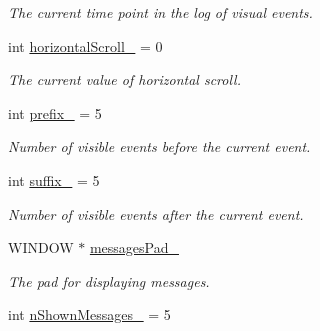 \begin{DoxyCompactItemize}
\begin{DoxyCompactList}\small\item\em The current time point in the log of visual events. \end{DoxyCompactList}\item 
int \hyperlink{structLogWindow_a8f55a1cb912c65f4c0cc5eba7d11cf3c}{horizontal\+Scroll\+\_\+} = 0\hypertarget{structLogWindow_a8f55a1cb912c65f4c0cc5eba7d11cf3c}{}\label{structLogWindow_a8f55a1cb912c65f4c0cc5eba7d11cf3c}

\begin{DoxyCompactList}\small\item\em The current value of horizontal scroll. \end{DoxyCompactList}\item 
int \hyperlink{structLogWindow_a30e6ca2c1b89cbbd8a4d02f041e090be}{prefix\+\_\+} = 5\hypertarget{structLogWindow_a30e6ca2c1b89cbbd8a4d02f041e090be}{}\label{structLogWindow_a30e6ca2c1b89cbbd8a4d02f041e090be}

\begin{DoxyCompactList}\small\item\em Number of visible events before the current event. \end{DoxyCompactList}\item 
int \hyperlink{structLogWindow_aebb15a8089f81bcaa513d77d9441d9b6}{suffix\+\_\+} = 5\hypertarget{structLogWindow_aebb15a8089f81bcaa513d77d9441d9b6}{}\label{structLogWindow_aebb15a8089f81bcaa513d77d9441d9b6}

\begin{DoxyCompactList}\small\item\em Number of visible events after the current event. \end{DoxyCompactList}\item 
W\+I\+N\+D\+OW $\ast$ \hyperlink{structLogWindow_aab3b4b4ca28bcc4be243602238383971}{messages\+Pad\+\_\+}\hypertarget{structLogWindow_aab3b4b4ca28bcc4be243602238383971}{}\label{structLogWindow_aab3b4b4ca28bcc4be243602238383971}

\begin{DoxyCompactList}\small\item\em The pad for displaying messages. \end{DoxyCompactList}\item 
int \hyperlink{structLogWindow_adae9a621e7bd1182b3faabd704fd3518}{n\+Shown\+Messages\+\_\+} = 5\hypertarget{structLogWindow_adae9a621e7bd1182b3faabd704fd3518}{}\label{structLogWindow_adae9a621e7bd1182b3faabd704fd3518}


\end{DoxyCompactItemize}
